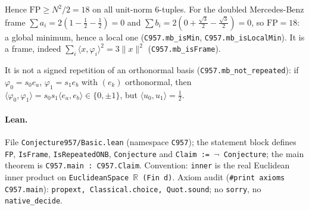 \documentclass[11pt]{article}
\begin{document}
Hence $\mathrm{FP}\ge N^2/2=18$ on all unit-norm 6-tuples. For the doubled Mercedes-Benz frame $\sum a_i=2(1-\tfrac12-\tfrac12)=0$ and $\sum b_i=2(0+\tfrac{\sqrt3}2-\tfrac{\sqrt3}2)=0$, so $\mathrm{FP}=18$: a global minimum, hence a local one (\texttt{C957.mb\_isMin}, \texttt{C957.mb\_isLocalMin}). It is a frame, indeed $\sum_i\langle x,\varphi_i\rangle^2=3\|x\|^2$ (\texttt{C957.mb\_isFrame}).

It is not a signed repetition of an orthonormal basis (\texttt{C957.mb\_not\_repeated}): if $\varphi_0=s_0e_a$, $\varphi_1=s_1e_b$ with $(e_k)$ orthonormal, then $\langle\varphi_0,\varphi_1\rangle=s_0s_1\langle e_a,e_b\rangle\in\{0,\pm1\}$, but $\langle u_0,u_1\rangle=\tfrac12$.

\paragraph{Lean.} File \texttt{Conjecture957/Basic.lean} (namespace \texttt{C957}); the statement block defines \texttt{FP}, \texttt{IsFrame}, \texttt{IsRepeatedONB}, \texttt{Conjecture} and \texttt{Claim := $\neg$ Conjecture}; the main theorem is \texttt{C957.main : C957.Claim}. Convention: \texttt{inner} is the real Euclidean inner product on \texttt{EuclideanSpace $\mathbb R$ (Fin d)}. Axiom audit (\texttt{\#print axioms C957.main}): \texttt{propext, Classical.choice, Quot.sound}; no \texttt{sorry}, no \texttt{native\_decide}.
\end{document}
